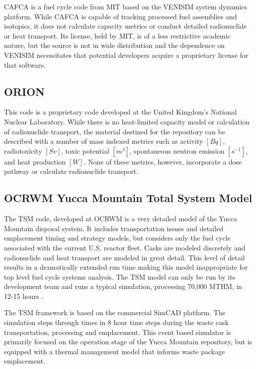 \gls{CAFCA} is a fuel cycle code from \gls{MIT} based on the VENISIM system 
dynamics platform. While \gls{CAFCA} is 
capable of tracking processed fuel assemblies and isotopics, it does not 
calculate capacity metrics or conduct detailed radionuclide or heat transport. Its 
license, held by \gls{MIT}, is of a less restrictive academic nature, but the 
source is not in wide distribution and the dependence on VENISIM necessitates 
that potential developers acquire a proprietary license for that software. 

\subsection{ORION} 

This code is a proprietary code developed at the United
Kingdom's National Nuclear Laboratory. While there is no heat-limited capacity 
model or calculation of radionuclide transport, the material destined for the 
repository can be described with a number of mass indexed metrics such as activity 
$[Bq]$, radiotoxicity $[Sv]$,  toxic potential $[m^3]$, spontaneous neutron emission 
$[s^{-1}]$, and heat production $[W]$. None of these metrics, however, 
incorporate a dose pathway or calculate radionuclide transport. 



\subsection{OCRWM Yucca Mountain Total System Model}

The \gls{TSM} code, 
developed at \gls{OCRWM} is a very detailed model of the Yucca Mountain disposal 
system. It includes transportation issues and detailed emplacement timing and 
strategy models, but considers only the fuel cycle associated with the current  
U.S.  reactor fleet. Casks are modeled discretely and radionuclide and heat transport 
are modeled in great detail.  This level of detail results in a dramatically extended
run time making this model inappropriate for top level fuel cycle systems analysis. 
The \gls{TSM} model can only be run by its development team and runs a typical 
simulation, processing 70,000 MTHM, in 12-15 hours \cite{turner_discrete_2010}. 

The TSM framework is based on the commercial SimCAD platform. The simulation 
steps through times in 8 hour time steps during the waste cask transportation, 
processing and emplacement. This event based simulator is primarily focused on 
the operation stage of the Yucca Mountain repository, but is equipped with a 
thermal management model that informs waste package emplacement.


